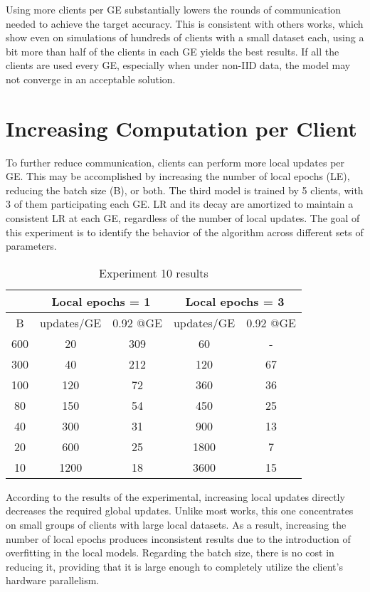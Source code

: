 Using more clients per GE substantially lowers the rounds of communication needed to achieve the target accuracy. This is consistent with others works, which show even on simulations of hundreds of clients with a small dataset each, using a bit more than half of the clients in each GE yields the best results. If all the clients are used every GE, especially when under non-IID data, the model may not converge in an acceptable solution.
    
\section{Increasing Computation per Client}
To further reduce communication, clients can perform more local updates per GE. This may be accomplished by increasing the number of local epochs (LE), reducing the batch size (B), or both. The third model is trained by 5 clients, with 3 of them participating each GE. LR and its decay are amortized to maintain a consistent LR at each GE, regardless of the number of local updates. The goal of this experiment is to identify the behavior of the algorithm across different sets of parameters.
\begin{table}[H]
    \center
    \begin{tabular}{ | c | c c | c c | }
        \hline
        & \multicolumn{2}{|c|}{Local epochs = 1} & \multicolumn{2}{|c|}{Local epochs = 3} \\\hline
        B & updates/GE &  0.92 @GE & updates/GE &  0.92 @GE\\\hline
        600 & 20 & 309 & 60 & -\\
        300 & 40 & 212 & 120 & 67\\
        100 & 120 & 72 & 360 & 36\\
        80 & 150 & 54 & 450 & 25\\
        40 & 300 & 31 & 900 & 13\\
        20 & 600 & 25 & 1800 & 7\\
        10 & 1200 & 18 & 3600 & 15\\\hline
    \end{tabular}
    \caption[Experiment 10 results]{Experiment 10 results}
\end{table}
According to the results of the experimental, increasing local updates directly decreases the required global updates. Unlike most works, this one concentrates on small groups of clients with large local datasets. As a result, increasing the number of local epochs produces inconsistent results due to the introduction of overfitting in the local models. Regarding the batch size, there is no cost in reducing it, providing that it is large enough to completely utilize the client's hardware parallelism.

